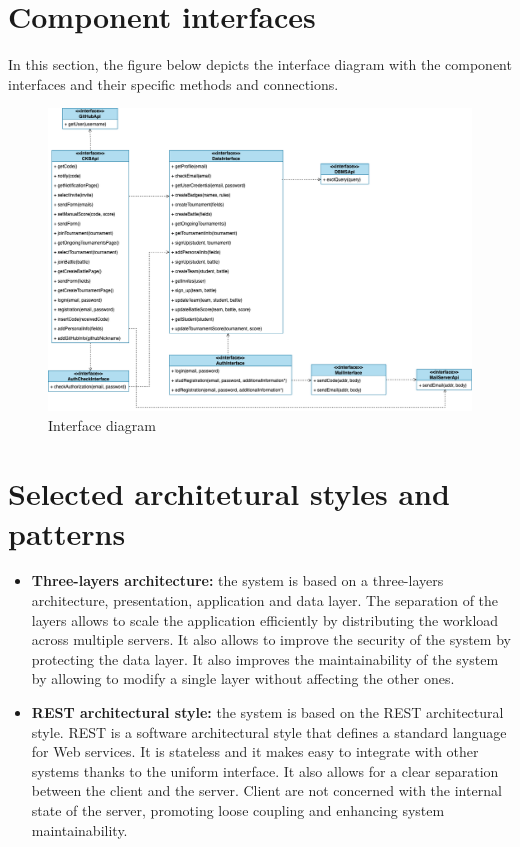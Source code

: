 \section{Component interfaces}
In this section, the figure below depicts the interface diagram with the component interfaces and their specific methods and connections.
\begin{figure}[H]
    \centering
    \includegraphics[width=1\textwidth]{images/Interface_diagram.png}
    \caption{Interface diagram}
\end{figure}

\section{Selected architetural styles and patterns}

\begin{itemize}
    \item \textbf{Three-layers architecture: }the system is based on a three-layers architecture, presentation, application and data layer. The separation of the layers
    allows to scale the application efficiently by distributing the workload across multiple servers. It also allows to improve the security of the system by protecting the data layer.
    It also improves the maintainability of the system by allowing to modify a single layer without affecting the other ones.
    \item \textbf{REST architectural style: }the system is based on the REST architectural style. REST is a software architectural style that defines a standard language for Web services. It is stateless and it makes easy
    to integrate with other systems thanks to the uniform interface. It also allows for a clear separation between the client and the server. Client are not concerned with the internal state of the server, promoting loose coupling
    and enhancing system maintainability.
\end{itemize}

